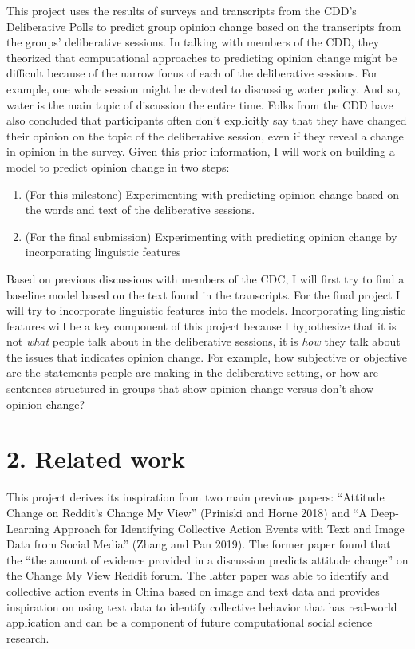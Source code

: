 \documentclass[11pt,]{article}
\providecommand{\tightlist}{%
\setlength{\itemsep}{0pt}\setlength{\parskip}{0pt}}
\begin{document}
This project uses the results of surveys and transcripts from the CDD's
Deliberative Polls to predict group opinion change based on the
transcripts from the groups' deliberative sessions. In talking with
members of the CDD, they theorized that computational approaches to
predicting opinion change might be difficult because of the narrow focus
of each of the deliberative sessions. For example, one whole session
might be devoted to discussing water policy. And so, water is the main
topic of discussion the entire time. Folks from the CDD have also
concluded that participants often don't explicitly say that they have
changed their opinion on the topic of the deliberative session, even if
they reveal a change in opinion in the survey. Given this prior
information, I will work on building a model to predict opinion change
in two steps:

\begin{enumerate}
\def\labelenumi{\arabic{enumi}.}
\tightlist
\item
  (For this milestone) Experimenting with predicting opinion change
  based on the words and text of the deliberative sessions.
\item
  (For the final submission) Experimenting with predicting opinion
  change by incorporating linguistic features
\end{enumerate}

Based on previous discussions with members of the CDC, I will first try
to find a baseline model based on the text found in the transcripts. For
the final project I will try to incorporate linguistic features into the
models. Incorporating linguistic features will be a key component of
this project because I hypothesize that it is not \emph{what} people
talk about in the deliberative sessions, it is \emph{how} they talk
about the issues that indicates opinion change. For example, how
subjective or objective are the statements people are making in the
deliberative setting, or how are sentences structured in groups that
show opinion change versus don't show opinion change?

\hypertarget{related-work}{%
\section{2. Related work}\label{related-work}}

This project derives its inspiration from two main previous papers:
``Attitude Change on Reddit's Change My View'' (Priniski and Horne 2018)
and ``A Deep-Learning Approach for Identifying Collective Action Events
with Text and Image Data from Social Media'' (Zhang and Pan 2019). The
former paper found that the ``the amount of evidence provided in a
discussion predicts attitude change'' on the Change My View Reddit
forum. The latter paper was able to identify and collective action
events in China based on image and text data and provides inspiration on
using text data to identify collective behavior that has real-world
application and can be a component of future computational social
science research.
\end{document}
